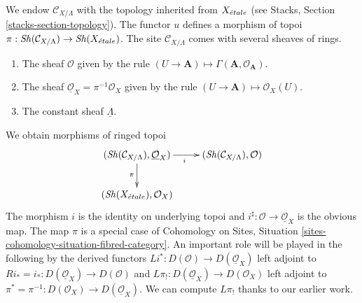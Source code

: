 \noindent
We endow $\mathcal{C}_{X/\Lambda}$ with the topology inherited from
$X_{\acute{e}tale}$ (see Stacks, Section \ref{stacks-section-topology}).
The functor $u$ defines a morphism of topoi
$\pi : \mathop{\mathit{Sh}}\nolimits(\mathcal{C}_{X/\Lambda}) \to \mathop{\mathit{Sh}}\nolimits(X_{\acute{e}tale})$.
The site $\mathcal{C}_{X/\Lambda}$ comes with several sheaves of rings.
\begin{enumerate}
\item The sheaf $\mathcal{O}$ given by the rule
$(U \to \mathbf{A}) \mapsto \Gamma(\mathbf{A}, \mathcal{O}_\mathbf{A})$.
\item The sheaf $\underline{\mathcal{O}}_X = \pi^{-1}\mathcal{O}_X$ given by
the rule $(U \to \mathbf{A}) \mapsto \mathcal{O}_X(U)$.
\item The constant sheaf $\underline{\Lambda}$.
\end{enumerate}
We obtain morphisms of ringed topoi
\begin{equation}
\label{equation-pi-spaces}
\vcenter{
\xymatrix{
(\Sh(\mathcal{C}_{X/\Lambda}), \underline{\mathcal{O}}_X) \ar[r]_i \ar[d]_\pi &
(\Sh(\mathcal{C}_{X/\Lambda}), \mathcal{O}) \\
(\Sh(X_\etale), \mathcal{O}_X)
}
}
\end{equation}
The morphism $i$ is the identity on underlying topoi and
$i^\sharp : \mathcal{O} \to \underline{\mathcal{O}}_X$
is the obvious map.
The map $\pi$ is a special case of Cohomology on Sites, Situation
\ref{sites-cohomology-situation-fibred-category}.
An important role will be played in the following
by the derived functors
$
Li^* : D(\mathcal{O}) \longrightarrow D(\underline{\mathcal{O}}_X)
$
left adjoint to $Ri_* = i_* : D(\underline{\mathcal{O}}_X) \to D(\mathcal{O})$
and
$
L\pi_! : D(\underline{\mathcal{O}}_X) \longrightarrow D(\mathcal{O}_X)
$
left adjoint to
$\pi^* = \pi^{-1} : D(\mathcal{O}_X) \to D(\underline{\mathcal{O}}_X)$.
We can compute $L\pi_!$ thanks to our earlier work.


